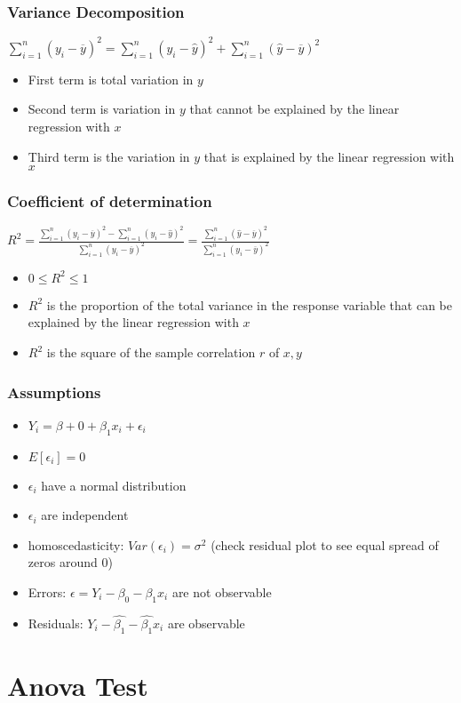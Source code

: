 \documentclass{article}
\begin{document}
\subsubsection{Variance Decomposition}
$\sum_{i=1}^n(y_i-\overline{y})^2=\sum_{i=1}^n(y_i-\hat{y})^2+\sum_{i=1}^n(\hat{y}-\overline{y})^2$\\
\begin{itemize}
    \item First term is total variation in $y$
    \item Second term is variation in $y$ that cannot be explained by the linear regression with $x$
    \item Third term is the variation in $y$ that is explained by the linear regression with $x$
\end{itemize}
\subsubsection{Coefficient of determination}
$R^2=\frac{\sum_{i=1}^n(y_i-\overline{y})^2-\sum_{i=1}^n(y_i-\hat{y})^2}{\sum_{i=1}^n(y_i-\overline{y})^2}=\frac{\sum_{i=1}^n(\hat{y}-\overline{y})^2}{\sum_{i=1}^n(y_i-\overline{y})^2}$
\begin{itemize}
    \item $0\leq R^2\leq 1$
    \item $R^2$ is the proportion of the total variance in the response variable that can be explained by the linear regression with $x$
    \item $R^2$ is the square of the sample correlation $r$ of $x,y$
\end{itemize}
\subsubsection{Assumptions}
\begin{itemize}
    \item $Y_i=\beta+0+\beta_1x_i+\epsilon_i$
    \item $E[\epsilon_i]=0$
    \item $\epsilon_i$ have a normal distribution
    \item $\epsilon_i$ are independent
    \item homoscedasticity: $Var(\epsilon_i)=\sigma^2$ (check residual plot to see equal spread of zeros around 0)
    \item Errors: $\epsilon = Y_i-\beta_0-\beta_1x_i$ are not observable
    \item Residuals: $Y_i-\hat{\beta_1}-\hat{\beta_1}x_i$ are observable
\end{itemize}
\section{Anova Test}
\label{sec:anova}
\end{document}
